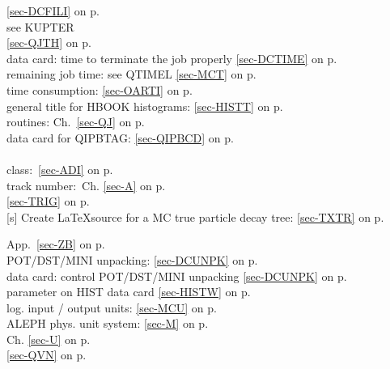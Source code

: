  
 \ref{sec-DCFILI} on p.~\pageref{sec-DCFILI}\\
 see KUPTER\\
 \ref{sec-QJTH} on p.~\pageref{sec-QJTH}\\
 data card: time to terminate the job properly
 \ref{sec-DCTIME} on p.~\pageref{sec-DCTIME}\\
 remaining job time: see QTIMEL \ref{sec-MCT} on p.~\pageref{sec-MCT}\\
 time consumption: \ref{sec-OARTI} on p.~\pageref{sec-OARTI}\\
 general title for HBOOK histograms: \ref{sec-HISTT} on p.~\pageref{sec-HISTT}\\
 routines: Ch.~\ref{sec-QJ} on p.~\pageref{sec-QJ}\\
 data card for QIPBTAG: \ref{sec-QIPBCD} on p.~\pageref{sec-QIPBCD}\\
 \\
 \mysubitem class:~\ref{sec-ADI} on p.~\pageref{sec-ADI}\\
 \mysubitem track number:~Ch. \ref{sec-A} on p.~\pageref{sec-A}\\
 \ref{sec-TRIG} on p.~\pageref{sec-TRIG}\\
 [s] Create \LaTeX source for a MC true particle decay tree:
 \ref{sec-TXTR} on p.~\pageref{sec-TXTR}
 
 
 App.~\ref{sec-ZB} on p.~\pageref{sec-ZB}\\
 POT/DST/MINI unpacking: \ref{sec-DCUNPK} on p.~\pageref{sec-DCUNPK}\\
 data card: control POT/DST/MINI unpacking \ref{sec-DCUNPK} on p.~\pageref{sec-DCUNPK}\\
 parameter on HIST data card
 \ref{sec-HISTW} on p.~\pageref{sec-HISTW}\\
 log. input / output units: \ref{sec-MCU} on p.~\pageref{sec-MCU}\\
 ALEPH phys. unit system:
 \ref{sec-M} on p.~\pageref{sec-M}\\
 Ch. \ref{sec-U} on p.~\pageref{sec-U}\\
 \ref{sec-QVN} on p.~\pageref{sec-QVN}
 
